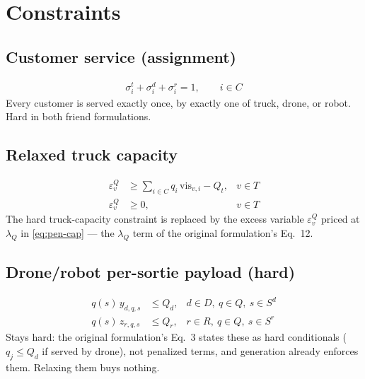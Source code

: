 \documentclass[10pt]{article}
\begin{document}
\section{Constraints}
\label{sec:constraints}

\subsection{Customer service (assignment)}
\begin{align}
\sigma^t_i + \sigma^d_i + \sigma^r_i = 1, \qquad i\in C \label{eq:service}
\end{align}
\noindent Every customer is served exactly once, by exactly one of truck,
drone, or robot. Hard in both friend formulations.

\subsection{Relaxed truck capacity}
\label{sec:rel-cap}
\begin{align}
\varepsilon^Q_v &\ge \sum_{i\in C} q_i\, \mathrm{vis}_{v,i} - Q_t, & v\in T \label{eq:cap-truck-soft}\\
\varepsilon^Q_v &\ge 0, & v\in T \label{eq:cap-truck-nonneg}
\end{align}
\noindent The hard truck-capacity constraint is replaced by the excess variable
$\varepsilon^Q_v$ priced at $\lambda_Q$ in \eqref{eq:pen-cap} --- the
$\lambda_Q$ term of the original formulation's Eq.~12.

\subsection{Drone/robot per-sortie payload (hard)}
\begin{align}
q(s)\, y_{d,q,s} &\le Q_d, & d\in D,\ q\in Q,\ s\in S^d \label{eq:cap-drone}\\
q(s)\, z_{r,q,s} &\le Q_r, & r\in R,\ q\in Q,\ s\in S^r \label{eq:cap-robot}
\end{align}
\noindent Stays hard: the original formulation's Eq.~3 states these as hard
conditionals ($q_j \le Q_d$ if served by drone), not penalized terms, and
generation already enforces them. Relaxing them buys nothing.
\end{document}
